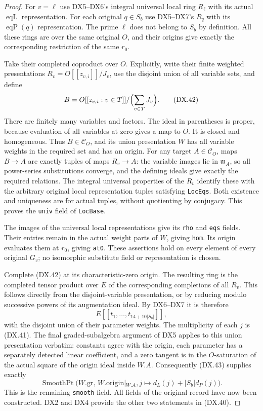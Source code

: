 \begin{proof}
For $v=\ell$ use DX5--DX6's integral universal local ring
$R_\ell$ with its actual $\operatorname{eqL}$ representation.
For each original $q\in S_b$ use DX5--DX7's $R_q$
with its $\operatorname{eqP}(q)$ representation.
The prime $\ell$ does not belong to $S_b$ by definition.
All these rings are over the same original $O$, and their
origins give exactly the corresponding restriction of
the same $r_0$.

Take their completed coproduct over $O$.
Explicitly, write their finite weighted presentations
$R_v=O[[z_{v,i}]]/J_v$, use the disjoint union of all
variable sets, and define
\[
       B=O[[z_{v,i}:v\in T]]/
                     \Bigl(\sum_{v\in T}J_v\Bigr).
 \tag{DX.42}
\]
There are finitely many variables and factors.
The ideal in parentheses is proper, because evaluation
of all variables at zero gives a map to $O$.
It is closed and homogeneous.  Thus $B\in\mathcal C_O$,
and its union presentation $W$ has all variable weights
in the required set and has an origin.
For any target $A\in\mathcal C_O$, maps $B\to A$
are exactly tuples of maps $R_v\to A$:
the variable images lie in $\mathfrak m_A$, so all
power-series substitutions converge, and the defining
ideals give exactly the required relations.
The integral universal properties of the $R_v$ identify
these with the arbitrary original local representation
tuples satisfying \texttt{LocEqs}.
Both existence and uniqueness are for actual tuples,
without quotienting by conjugacy.
This proves the \texttt{univ} field of \texttt{LocBase}.

The images of the universal local representations give
its \texttt{rho} and \texttt{eqs} fields.
Their entries remain in the actual weight parts of $W$,
giving \texttt{hom}.
Its origin evaluates them at $r_0$, giving \texttt{at0}.
These assertions hold on every element of every original
$G_v$; no isomorphic substitute field or representation
is chosen.

Complete (DX.42) at its characteristic-zero origin.
The resulting ring is the completed tensor product over
$E$ of the corresponding completions of all $R_v$.
This follows directly from the disjoint-variable
presentation, or by reducing modulo successive powers
of its augmentation ideal.
By DX6--DX7 it is therefore
\[
                 E[[t_1,\ldots,t_{14+10|S_b|}]],
 \tag{DX.43}
\]
with the disjoint union of their parameter weights.
The multiplicity of each $j$ is (DX.41).
The final graded-subalgebra argument of DX5 applies to
this union presentation verbatim: constants agree with
the origin, each parameter has a separately detected
linear coefficient, and a zero tangent is in the
$O$-saturation of the actual square of the origin ideal
inside $W.\!A$.
Consequently (DX.43) supplies exactly
\[
 \operatorname{SmoothPt}
      \bigl(W.\mathrm{gr},\,W.\mathrm{origin}|_{W.A},
                          j\mapsto d_L(j)+|S_b|d_P(j)\bigr).
\]
This is the remaining \texttt{smooth} field.
All fields of the original record have now been constructed.
DX2 and DX4 provide the other two statements in (DX.40).
\end{proof}

